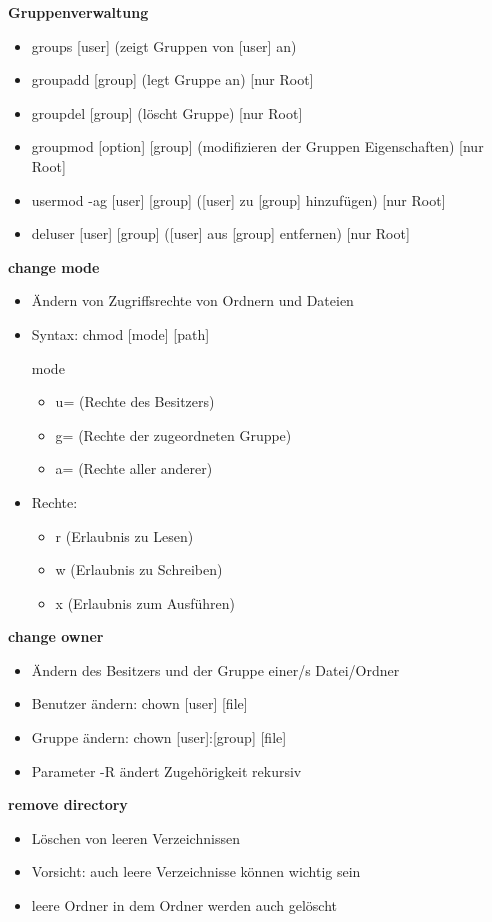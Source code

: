 \documentclass{article}
\begin{document}
\textbf{Gruppenverwaltung}
\begin{itemize}
	\item groups [user] (zeigt Gruppen von [user] an)
	\item groupadd [group] (legt Gruppe an) [nur Root]
	\item groupdel [group] (löscht Gruppe)  [nur Root]
	\item groupmod [option] [group] (modifizieren der Gruppen Eigenschaften) [nur Root]
	\item usermod -ag [user] [group] ([user] zu [group] hinzufügen) [nur Root]
	\item deluser [user] [group] ([user] aus [group] entfernen) [nur Root]
\end{itemize}

\textbf{change mode}
\begin{itemize}
	\item Ändern von Zugriffsrechte von Ordnern und Dateien
	\item Syntax: chmod [mode] [path]
	\item [mode]
	\begin{itemize}
		\item u= (Rechte des Besitzers)
		\item g= (Rechte der zugeordneten Gruppe)
		\item a= (Rechte aller anderer)
	\end{itemize}	 
	\item Rechte:
	\begin{itemize}
		\item r (Erlaubnis zu Lesen)
		\item w (Erlaubnis zu Schreiben)
		\item x (Erlaubnis zum Ausführen)
	\end{itemize}
\end{itemize}

\textbf{change owner}
\begin{itemize}
	\item Ändern des Besitzers und der Gruppe einer/s Datei/Ordner
	\item Benutzer ändern: chown [user] [file]
	\item Gruppe ändern: chown [user]:[group] [file]
	\item Parameter -R ändert Zugehörigkeit rekursiv
\end{itemize}

\textbf{remove directory}
\begin{itemize}
	\item Löschen von leeren Verzeichnissen
	\item Vorsicht: auch leere Verzeichnisse können wichtig sein
	\item leere Ordner in dem Ordner werden auch gelöscht
\end{itemize}
\end{document}
